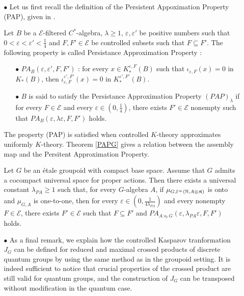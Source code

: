 \begin{itemize}

\item[$\bullet$] Let us first recall the definition of the Persistent Appoximation Property (PAP), given in \cite{OY3}.\\

\begin{definition}
Let $B$ be a $\mathcal E$-filtered $C^*$-algebra, $\lambda \geq 1$, $\varepsilon,\varepsilon'$ be positive numbers such that $0<\varepsilon <\varepsilon' <\frac{1}{4}$ and $F,F'\in\mathcal E$ be controlled subsets such that $F\subseteq F'$. The following property is called Persistance Approximation Property :
\begin{itemize}
\item[$\bullet$] $PA_B(\varepsilon,\varepsilon',F,F')$ : for every $x\in K_*^{\varepsilon,F}(B)$ such that $\iota_{\varepsilon,F}(x)=0$ in $K_*(B)$, then $\iota_{\varepsilon,F}^{\varepsilon',F'}(x)=0$ in $K_*^{\varepsilon',F'}(B)$.
\item[$\bullet$] $B$ is said to satisfy the Persistance Approximation Property $(PAP)_\lambda$ if for every $F\in\mathcal E$ and every $\varepsilon\in (0,\frac{1}{4})$, there exists $F'\in\mathcal E$ nonempty such that $PA_B(\varepsilon,\lambda\varepsilon,F,F')$ holds.\\
\end{itemize}
\end{definition}

The property (PAP) is satisfied when controlled $K$-theory approximates uniformly $K$-theory. Theorem \ref{PAPG} gives a relation between the assembly map and the Persitent Approximation Property. \\

\begin{thm} 
Let $G$ be an étale groupoid with compact base space. Assume that $G$ admits a cocompact universal space for proper actions. Then there exists a universal constant $\lambda_{PA} \geq 1$ such that, for every $G$-algebra $A$, if $\mu_{G,l^\infty(\mathbb N, A\otimes\mathfrak K)}$ is onto and $\mu_{G,A}$ is one-to-one, then for every $\varepsilon \in(0,\frac{1}{4\lambda_{PA}})$ and every nonempty $F\in\mathcal E$, there exists $F'\in\mathcal E$ such that $F\subseteq F'$ and $PA_{A\rtimes_r G}(\varepsilon,\lambda_{PA}\varepsilon,F,F')$ holds.\\
\end{thm}

\item[$\bullet$] As a final remark, we explain how the controlled Kasparov tranformation $J_G$ can be defined for reduced and maximal crossed products of discrete quantum groups by using the same method as in the groupoid setting. It is indeed sufficient to notice that crucial properties of the crossed product are still valid for quantum groups, and the construction of $J_G$ can be transposed without modification in the quantum case.\\


\end{itemize}
